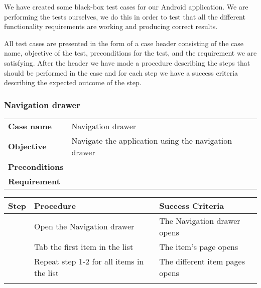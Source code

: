 We have created some black-box test cases for our Android application. We are performing the tests ourselves, we do this in order to test that all the different functionality requirements are working and producing correct results.

All test cases are presented in the form of a case header consisting of the case name, objective of the test, preconditions for the test, and the requirement we are satisfying. After the header we have made a procedure describing the steps that should be performed in the case and for each step we have a success criteria describing the expected outcome of the step. 

\newcommand{\testcase}[4]
{
\subsubsection*{#1}
\begin{center}
\begin{tabular}{p{2.6cm} p{10cm}}
\hline
\textbf{Case name} & #1\\
\textbf{Objective} & #2\\
\textbf{Preconditions} & #3\\
\textbf{Requirement} & #4\\
\hline
\end{tabular}
\end{center}
}

\newenvironment{testprocedure}%
{\newcommand{\step}{\arabic{counter}\stepcounter{counter}}
\setcounter{counter}{1}
\begin{center}
\begin{tabular}{| c | p{5.4cm} | p{5.4cm} |}
\hline
\textbf{Step} & \textbf{Procedure} & \textbf{Success Criteria}\\
\hline}
{\hline
\multicolumn{3}{c}{} \\%
\end{tabular}
\end{center}}

\testcase
{Navigation drawer}
{Navigate the application using the navigation drawer}
{}
{}

\begin{testprocedure}
\step & Open the Navigation drawer & The Navigation drawer opens\\
\hline
\step & Tab the first item in the list & The item's page opens\\
\hline
\step & Repeat step 1-2 for all items in the list & The different item pages opens \\
\end{testprocedure}

